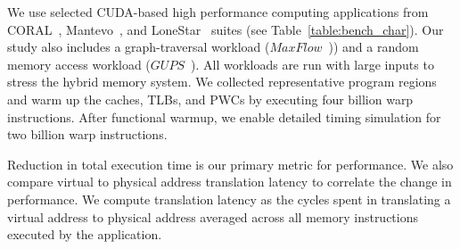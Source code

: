 \noindent We use selected CUDA-based high performance computing
applications from CORAL~\cite{CORAL}, Mantevo~\cite{mantevo}, and
LoneStar~\cite{lonestar} suites (see Table~\ref{table:bench_char}).
Our study also includes a graph-traversal workload
($MaxFlow$~\cite{maxflow})) and a random memory access workload
($GUPS$~\cite{gups}). All workloads are run with large inputs to
stress the hybrid memory system. We collected representative program
regions and warm up the caches, TLBs, and PWCs by executing four
billion warp instructions. After functional warmup, we enable detailed
timing simulation for two billion warp instructions.

Reduction in total execution time is our primary metric for
performance. We also compare virtual to physical address translation
latency to correlate the change in performance. We compute translation
latency as the cycles spent in translating a virtual address to
physical address averaged across all memory instructions executed by
the application.


